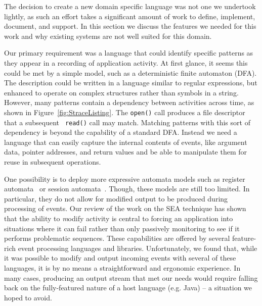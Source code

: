 The decision to create a new domain specific language was not one we
undertook lightly,
as such an effort takes
a significant amount of work
to define,
implement, document, and support.
In this section we discuss the features we needed for this work
and why existing systems are not well suited for this domain.

Our primary requirement was a language that could identify specific
patterns as they appear in a recording of application activity.
At first glance, it seems this could be met by a simple model,
such as a deterministic finite automaton (DFA).
The description could be written
in a language similar to
regular expressions, but enhanced to operate on complex
structures rather than symbols in a string.
However, many patterns contain a dependency
between activities
across time,
as shown in Figure~\ref{fig:StraceListing}.
The {\tt open()} call produces a file descriptor that a subsequent {\tt
read()} call may match.
Matching patterns with this sort of dependency is beyond the capability
of a standard DFA.
Instead we need a language
that can easily capture
the internal contents of events,
like argument data,
pointer addresses,
and return values
and be able to
manipulate them for
reuse in subsequent operations.

One possibility is to deploy more expressive automata models such as register automata~\cite{DBLP:journals/tcs/KaminskiF94} or session automata~\cite{DBLP:journals/corr/BolligHLM14}. Though, these models are still too limited.
In particular, they do not allow for modified output to be
produced during processing of events.
Our review of the work on the SEA technique has shown that the ability to
{\textit modify} activity is central to forcing
an application into situations where
it can fail rather than only passively monitoring to see if it performs
problematic sequences.
These capabilities are offered by several feature-rich event processing
languages and libraries.
Unfortunately, we found that, while it was possible to modify and output
incoming events with several of these languages,
it is by no means a straightforward
and ergonomic experience.
In many cases, producing an output stream that met
our needs would require
falling back on the fully-featured nature of a host language (e.g. Java) -- a situation
we hoped to avoid.

